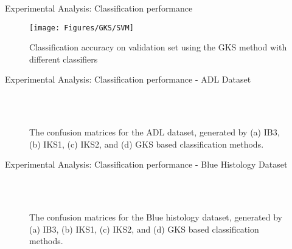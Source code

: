 \documentclass [9pt,times] {beamer}
\begin{document}
\begin{frame}{Experimental Analysis: Classification performance}
\begin{figure}
\centering
\texttt{[image: Figures/GKS/SVM]}
  \caption{{\scriptsize Classification accuracy on validation set using the GKS method with different classifiers}}\label{ch3:fig:svm}
\end{figure}
\end{frame}

\begin{frame}{Experimental Analysis: Classification performance - ADL Dataset}

\begin{figure}
\centering
{} ~
\\
~
\caption{{\scriptsize The confusion matrices for the ADL dataset,  generated by (a) IB3, (b) IKS1, (c) IKS2, and (d) GKS based classification methods.}}
\label{fig:CM1}
\end{figure}
\end{frame}


\begin{frame}{Experimental Analysis: Classification performance - Blue Histology Dataset}

\begin{figure}
\centering
{} ~~
\\
~~
\caption{{\scriptsize The confusion matrices for the Blue histology dataset, generated by (a) IB3, (b) IKS1, (c) IKS2, and (d) GKS based classification methods. }}
\label{fig:CM2}
\end{figure}
\end{frame}
\end{document}
